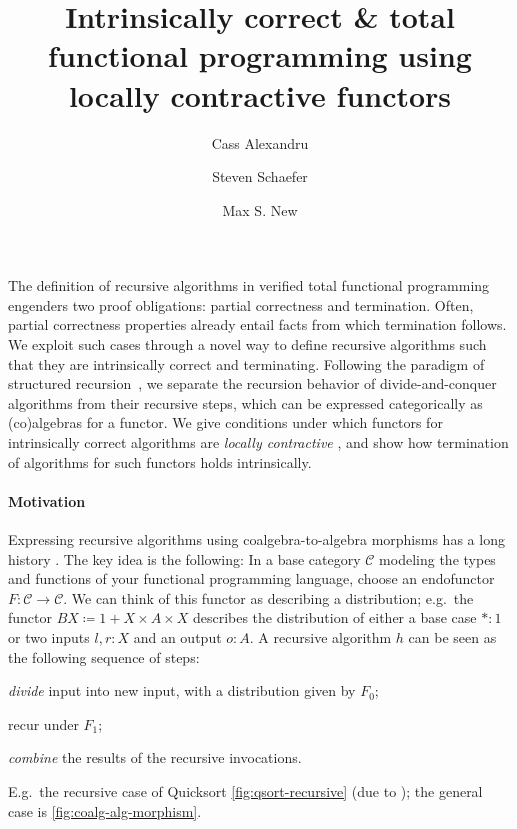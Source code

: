 \documentclass{./EasyChair3.5/easychair}
\title{Intrinsically correct \& total functional programming using locally contractive functors}
\author{
  Cass Alexandru \inst{1} \and Steven Schaefer \inst{2} \and Max S. New \inst{2}
}
\institute{
  RPTU Kaiserslautern-Landau, Radboud University Nijmegen
  \and University of Michigan
}
\theoremstyle{definition}
\theoremstyle{remark}
\begin{document}
\maketitle

The definition of recursive algorithms in verified total functional programming engenders two proof obligations: partial correctness and termination.
Often, partial correctness properties already entail facts from which termination follows.
We exploit such cases through a novel way to define recursive algorithms such that they are intrinsically correct and terminating.
Following the paradigm of structured recursion~\cite{hinzeConjugateHylomorphismsMother2015}, we separate the recursion behavior of divide-and-conquer algorithms from their recursive steps, which can be expressed categorically as (co)algebras for a functor.
We give conditions under which functors for intrinsically correct algorithms are \emph{locally contractive} \cite{birkedalFirstStepsSynthetic2012}, and show how termination of algorithms for such functors holds intrinsically.

\paragraph{Motivation}
Expressing recursive algorithms using coalgebra-to-algebra morphisms has a long history \cite{CaprettaUV06,jeanninWellfoundedCoalgebrasRevisited2017,taylor99,meijerFunctionalProgrammingBananas1991}.
The key idea is the following: In a base category \(𝒞\) modeling the types and functions of your functional programming language, choose an endofunctor \(F \colon 𝒞 → 𝒞\). We can think of this functor as describing a distribution; e.g.\ the functor \(B X ≔ 1 + X × A × X\) describes the distribution of either a base case \(* : 1\) or two inputs \(l , r : X\) and an output \(o : A\).
A recursive algorithm \(h\) can be seen as the following sequence of steps:
\begin{enumerate*}[itemjoin=~]
\item \emph{divide} input into new input, with a distribution given by \(F_0\);
\item recur under \(F_1\);
\item \emph{combine} the results of the recursive invocations.
\end{enumerate*}
E.g.\ the recursive case of Quicksort \autoref{fig:qsort-recursive} (due to \cite{CaprettaUV06}); the general case is \autoref{fig:coalg-alg-morphism}.
\end{document}
